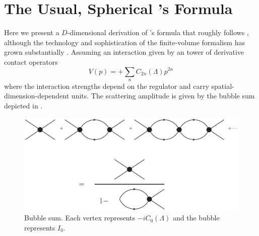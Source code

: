 \section{The Usual, Spherical \Luscher's Formula}\label{sec:spherical}


Here we present a $D$-dimensional derivation of \Luscher's formula that roughly follows , although the technology and sophistication of the finite-volume formalism has grown substantially .  Assuming an interaction given by an tower of derivative contact operators
\begin{equation}
    V(p) = +\sum_n C_{2n}(\Lambda) p^{2n}
\end{equation}
where the interaction strengths depend on the regulator and carry spatial-dimension-dependent units.
The scattering amplitude is given by the bubble sum depicted in .

\begin{figure}[ht!]
\center
\includegraphics[width=.8\columnwidth]{figure/bubbleSum.eps}
\caption{Bubble sum. Each vertex represents $-iC_0(\Lambda)$ and the bubble represents $I_0$.\label{fig:bubbleSum}}
\end{figure}

